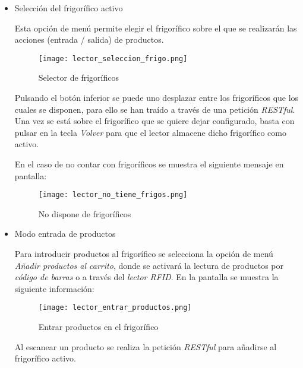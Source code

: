 \begin{itemize}

    \item Selección del frigorífico activo

        Esta opción de menú permite elegir el frigorífico sobre el que se realizarán las acciones (entrada / salida) de productos.

        \begin{figure}[h!]
            \centering
            \texttt{[image: lector\_seleccion\_frigo.png]}
            \caption{Selector de frigoríficos}\label{fig:lector_seleccion_frigo}
        \end{figure}


        Pulsando el botón inferior se puede uno desplazar entre los frigoríficos que los cuales se disponen, para ello se han traído a través de una petición \emph{RESTful}. Una vez se está sobre el frigorífico que se quiere dejar configurado, basta con pulsar en la tecla \emph{Volver} para que el lector almacene dicho frigorífico como activo.

        En el caso de no contar con frigoríficos se muestra el siguiente mensaje en pantalla:

        \begin{figure}[h!]
            \centering
            \texttt{[image: lector\_no\_tiene\_frigos.png]}
            \caption{No dispone de frigoríficos}\label{fig:lector_no_tiene_frigos}
        \end{figure}

    \item Modo entrada de productos

        Para introducir productos al frigorífico se selecciona la opción de menú \emph{Añadir productos al carrito}, donde se activará la lectura de productos por \emph{código de barras} o a través del \emph{lector RFID}. En la pantalla se muestra la siguiente información:

        \begin{figure}[h!]
            \centering
            \texttt{[image: lector\_entrar\_productos.png]}
            \caption{Entrar productos en el frigorífico}\label{fig:lector_entrar_productos}
        \end{figure}

        Al escanear un producto se realiza la petición \emph{RESTful} para añadirse al frigorífico activo.


\end{itemize}
